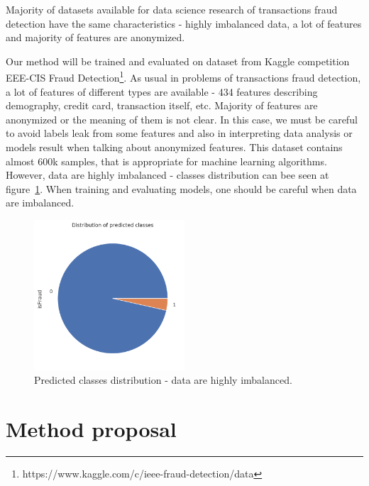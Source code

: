 \documentclass[runningheads]{llncs}
\begin{document}
Majority of datasets available for data science research of transactions fraud detection have the same characteristics - highly imbalanced data, a lot of features and majority of features are anonymized.

Our method will be trained and evaluated on dataset from Kaggle competition EEE-CIS Fraud Detection\footnote{https://www.kaggle.com/c/ieee-fraud-detection/data}. As usual in problems of transactions fraud detection, a lot of features of different types are available - 434 features describing demography, credit card, transaction itself, etc. Majority of features are anonymized or the meaning of them is not clear. In this case, we must be careful to avoid labels leak from some features and also in interpreting data analysis or models result when talking about anonymized features. This dataset contains almost 600k samples, that is appropriate for machine learning algorithms. However, data are highly imbalanced - classes distribution can bee seen at figure~\ref{fig:classes}. When training and evaluating models, one should be careful when data are imbalanced.

\begin{figure}[ht]
	\begin{center}
	    \includegraphics[width=0.5\textwidth]{figures/class_distribution.png}
    \end{center}
	\caption{Predicted classes distribution - data are highly imbalanced.}
	\label{fig:classes}
\end{figure}


\section{Method proposal}

\end{document}
